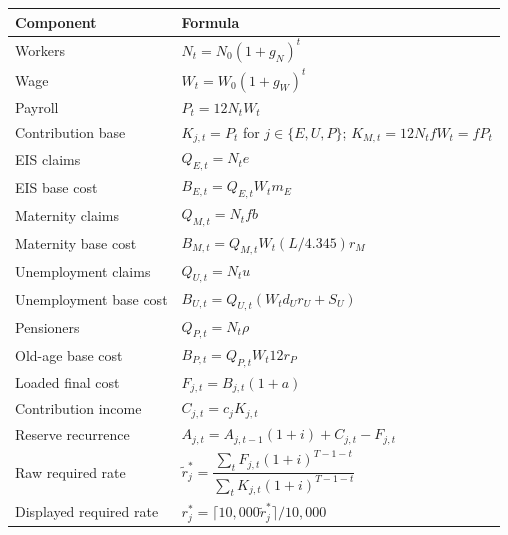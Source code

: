 \begin{longtable}{>{\raggedright\arraybackslash}p{} p{}}
\toprule
\textbf{Component} & \textbf{Formula} \\
\midrule
Workers & $N_t=N_0(1+g_N)^t$ \\
Wage & $W_t=W_0(1+g_W)^t$ \\
Payroll & $P_t=12N_tW_t$ \\
Contribution base & $K_{j,t}=P_t$ for $j\in\{E,U,P\}$; $K_{M,t}=12N_tfW_t=fP_t$ \\
EIS claims & $Q_{E,t}=N_te$ \\
EIS base cost & $B_{E,t}=Q_{E,t}W_tm_E$ \\
Maternity claims & $Q_{M,t}=N_tfb$ \\
Maternity base cost & $B_{M,t}=Q_{M,t}W_t(L/4.345)r_M$ \\
Unemployment claims & $Q_{U,t}=N_tu$ \\
Unemployment base cost & $B_{U,t}=Q_{U,t}(W_td_Ur_U+S_U)$ \\
Pensioners & $Q_{P,t}=N_t\rho$ \\
Old-age base cost & $B_{P,t}=Q_{P,t}W_t12r_P$ \\
Loaded final cost & $F_{j,t}=B_{j,t}(1+a)$ \\
Contribution income & $C_{j,t}=c_jK_{j,t}$ \\
Reserve recurrence & $A_{j,t}=A_{j,t-1}(1+i)+C_{j,t}-F_{j,t}$ \\
Raw required rate & $\widetilde r_j^{\ast}=\dfrac{\sum_tF_{j,t}(1+i)^{T-1-t}}{\sum_tK_{j,t}(1+i)^{T-1-t}}$ \\
Displayed required rate & $r_j^{\ast}=\lceil10{,}000\widetilde r_j^{\ast}\rceil/10{,}000$ \\
\bottomrule
\end{longtable}

